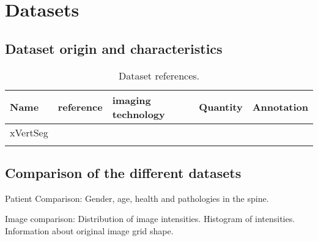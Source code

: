 \chapter{Datasets}

\section{Dataset origin and characteristics}

\begin{SCtable}[\sidecaptionrelwidth][h]
 
    \begin{tabular}{ l l l l l} 
     \hline
     \hline
     Name & reference & imaging technology & Quantity & Annotation \\
     \hline 
     xVertSeg &  & & &  \\ 
      &  & & & \\ 
     \hline
     \hline
    \end{tabular}
    \caption{Dataset references.}

\end{SCtable}

\section{Comparison of the different datasets}

Patient Comparison: Gender, age, health and pathologies in the spine.

Image comparison: 
Distribution of image intensities. Histogram of intensities.
Information about original image grid shape.